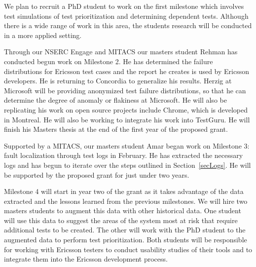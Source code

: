 
We plan to recruit a PhD student to work on the first milestone which involves test simulations of test prioritization and determining dependent tests. Although there is a wide range of work in this area, the students research will be conducted in a more applied setting.

Through our NSERC Engage and MITACS our masters student Rehman has conducted begun work on Milestone 2. He has determined the failure distributions for Ericsson test cases and the report he creates is used by Ericsson developers. He is returning to Concordia to generalize his results. Herzig at Microsoft will be providing anonymized test failure distributions, so that he can determine the degree of anomaly or flakiness at Microsoft. He will also be replicating his work on open source projects include Chrome, which is developed in Montreal. He will also be working to integrate his work into TestGuru. He will finish his Masters thesis at the end of the first year of the proposed grant.

Supported by a MITACS, our masters student Amar began work on Milestone 3: fault localization through test logs in February. He has extracted the necessary logs and has begun to iterate over the steps outlined in Section~\ref{secLogs}. He will be supported by the proposed grant for just under two years.

Milestone 4 will start in year two of the grant as it takes advantage of the data extracted and the lessons learned from the previous milestones. We will hire two masters students to augment this data with other historical data. One student will use this data to suggest the areas of the system most at risk that require additional tests to be created. The other will work with the PhD student to the augmented data to perform test prioritization. Both students will be responsible for working with Ericsson testers to conduct usability studies of their tools and to integrate them into the Ericsson development process.

